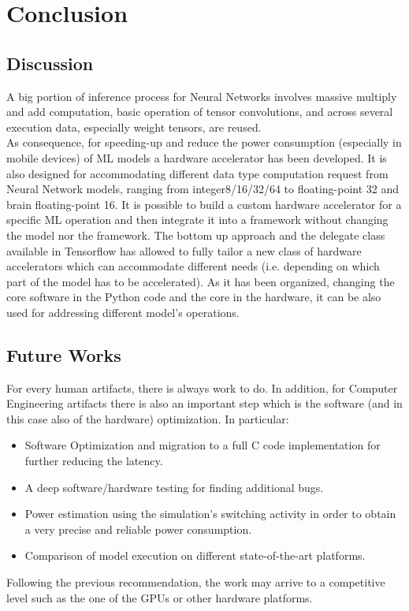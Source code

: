 \chapter{Conclusion}

\section{Discussion}A big portion of inference process for Neural Networks involves massive multiply and add computation, basic operation of tensor convolutions, and across several execution data, especially weight tensors, are reused.\\As consequence, for speeding-up and reduce the power consumption (especially in mobile devices) of ML models a hardware accelerator has been developed.
It is also designed for accommodating different data type computation request from Neural Network models, ranging from integer8/16/32/64 to floating-point 32 and brain floating-point 16.
It is possible to build a custom hardware accelerator for a specific ML operation and then integrate it into a framework without changing the model nor the framework.
The bottom up approach and the delegate class available in Tensorflow has allowed to fully tailor a new class of hardware accelerators which can accommodate different needs (i.e. depending on which part of the model has to be accelerated). As it has been organized, changing the core software in the Python code and the core in the hardware, it can be also used for addressing different model's operations.

\section{Future Works}
For every human artifacts, there is always work to do. In addition, for Computer Engineering artifacts there is also an important step which is the software (and in this case also of the hardware) optimization.
In particular:
\begin{itemize}
\item Software Optimization and migration to a full C code implementation for further reducing the latency.
\item A deep software/hardware testing for finding additional bugs.
\item Power estimation using the simulation’s switching activity in order to obtain a very precise and reliable power consumption.
\item Comparison of model execution on different state-of-the-art platforms.
\end{itemize}

Following the previous recommendation, the work may arrive to a competitive level such as the one of the GPUs or other hardware platforms.
